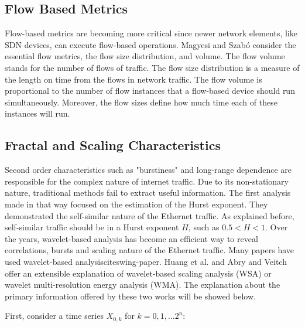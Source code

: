 \subsection{Flow Based Metrics}


Flow-based metrics are becoming more critical since newer network elements, like SDN devices, can execute flow-based operations\cite{validate-trafficgen}\cite{sdn-survey}. Magyesi and Szabó\cite{validate-trafficgen} consider the essential flow metrics, the flow size distribution, and volume. The flow volume stands for the number of flows of traffic. The flow size distribution is a measure of the length on time from the flows in network traffic. The flow volume is proportional to the number of flow instances that a flow-based device should run simultaneously. Moreover, the flow sizes define how much time each of these instances will run.


\subsection{Fractal and Scaling Characteristics}

Second order characteristics such as "burstiness" and long-range dependence are responsible for the complex nature of internet traffic\cite{validate-trafficgen}. Due to its non-stationary nature, traditional methods fail to extract useful information\cite{validate-trafficgen}. The first analysis made in that way focused on the estimation of the Hurst exponent\cite{selfsimilar-ethernet}. They demonstrated the self-similar nature of the Ethernet traffic. As explained before, self-similar traffic should be in a Hurst exponent $H$, such as $0.5 < H < 1$. Over the years, wavelet-based analysis has become an efficient way to reveal correlations, bursts and scaling nature of the Ethernet traffic\cite{validate-trafficgen}. Many papers have used wavelet-based analysiscite{swing-paper}\cite{non-intrusive-wavelet}\cite{wavelet-analysis-long-range}. Huang et al.\cite{non-intrusive-wavelet} and Abry and Veitch\cite{wavelet-analysis-long-range} offer an extensible explanation of wavelet-based scaling analysis (\acrfull{WSA}) or wavelet multi-resolution energy analysis (\acrfull{WMA}). The explanation about the primary information offered by these two works will be showed below. 

First, consider a time series $X_{0,k}$ for $k = 0, 1, ... 2^n$:

